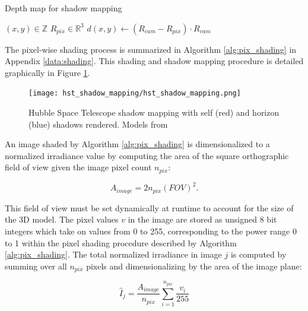 \begin{algorithm}
  \caption{Depth map for shadow mapping} \label{alg:depth_map}
  \begin{algorithmic}
    \State $(x, y) \in \mathbb{Z}$ 
    \State $R_{pix} \in \mathbb{R}^3$ 
    \State $d(x, y) \gets \left( R_{cam} - R_{pix} \right) \cdot R_{cam}$ 
  \end{algorithmic}
\end{algorithm}

The pixel-wise shading process is summarized in Algorithm \ref{alg:pix_shading} in Appendix \ref{data:shading}. This shading and shadow mapping procedure is detailed graphically in Figure \ref{fig:hst_shadows_map}.

\begin{figure}[!htb]
  \centering
  \texttt{[image: hst\_shadow\_mapping/hst\_shadow\_mapping.png]}
  \caption{Hubble Space Telescope shadow mapping with self (red) and horizon (blue) shadows rendered. Models from \cite{nasa_models}}
  \label{fig:hst_shadows_map}
\end{figure}
\graphicspath{{/Users/liamrobinson/Documents/PyLightCurves/docs/build/html/_images}}

An image shaded by Algorithm \ref{alg:pix_shading} is dimensionalized to a normalized irradiance value by computing the area of the square orthographic field of view given the image pixel count $n_{pix}$:

\begin{equation} \label{eq:ortho_area}
  A_{image} = 2 n_{pix} \left(FOV \right)^2.
\end{equation}

This field of view must be set dynamically at runtime to account for the size of the 3D model. The pixel values $v$ in the image are stored as unsigned 8 bit integers which take on values from 0 to 255, corresponding to the power range 0 to 1 within the pixel shading procedure described by Algorithm \ref{alg:pix_shading}. The total normalized irradiance in image $j$ is computed by summing over all $n_{pix}$ pixels and dimensionalizing by the area of the image plane:

\begin{equation} \label{eq:lc_normalized_engine}
  \hat{I}_j = \frac{A_{image}}{n_{pix}} \sum_{i=1}^{n_{pix}}{\frac{v_{i}}{255}}
\end{equation}

